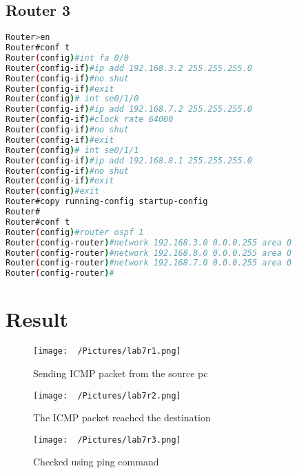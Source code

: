 \documentclass{article}
\begin{document}
\subsection{Router 3}
\begin{lstlisting}[language=bash]
Router>en
Router#conf t
Router(config)#int fa 0/0
Router(config-if)#ip add 192.168.3.2 255.255.255.0
Router(config-if)#no shut
Router(config-if)#exit
Router(config)# int se0/1/0
Router(config-if)#ip add 192.168.7.2 255.255.255.0
Router(config-if)#clock rate 64000
Router(config-if)#no shut
Router(config-if)#exit
Router(config)# int se0/1/1
Router(config-if)#ip add 192.168.8.1 255.255.255.0
Router(config-if)#no shut
Router(config-if)#exit
Router(config)#exit
Router#copy running-config startup-config
Router#
Router#conf t
Router(config)#router ospf 1
Router(config-router)#network 192.168.3.0 0.0.0.255 area 0
Router(config-router)#network 192.168.8.0 0.0.0.255 area 0
Router(config-router)#network 192.168.7.0 0.0.0.255 area 0
Router(config-router)#
\end{lstlisting}

\section{Result}
\begin{figure}[H]
    \centering
    \texttt{[image: ~/Pictures/lab7r1.png]}
    \caption{Sending ICMP packet from the source pc}
\end{figure}
\begin{figure}[H]
    \centering
    \texttt{[image: ~/Pictures/lab7r2.png]}
    \caption{The ICMP packet reached the destination}
\end{figure}
\begin{figure}[H]
    \centering
    \texttt{[image: ~/Pictures/lab7r3.png]}
    \caption{Checked using ping command}
\end{figure}
\end{document}
